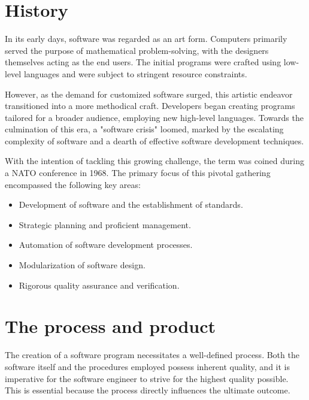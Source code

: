 \documentclass[12pt, a4paper]{report}
\begin{document}
    \section{History}
    In its early days, software was regarded as an art form. 
    Computers primarily served the purpose of mathematical problem-solving, with the designers themselves acting as the end users. 
    The initial programs were crafted using low-level languages and were subject to stringent resource constraints.
    
    However, as the demand for customized software surged, this artistic endeavor transitioned into a more methodical craft. 
    Developers began creating programs tailored for a broader audience, employing new high-level languages.
    Towards the culmination of this era, a "software crisis" loomed, marked by the escalating complexity of software and a dearth of effective software development techniques.

    With the intention of tackling this growing challenge, the term was coined during a NATO conference in 1968. 
    The primary focus of this pivotal gathering encompassed the following key areas:
    \begin{itemize}
        \item Development of software and the establishment of standards.
        \item Strategic planning and proficient management.
        \item Automation of software development processes.
        \item Modularization of software design.
        \item Rigorous quality assurance and verification.
    \end{itemize}

    \section{The process and product}
    The creation of a software program necessitates a well-defined process. 
    Both the software itself and the procedures employed possess inherent quality, and it is imperative for the software engineer to strive for the highest quality possible. 
    This is essential because the process directly influences the ultimate outcome.
    
\end{document}
